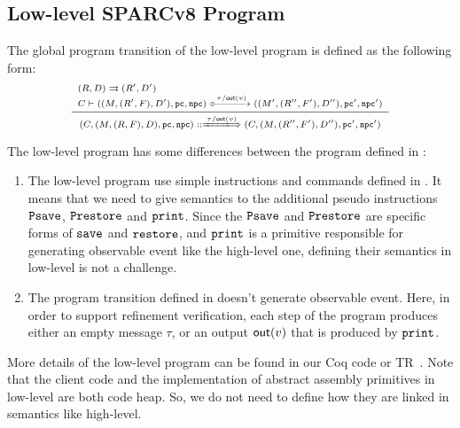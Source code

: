 \subsection{Low-level SPARCv8 Program}
\label{subsec:low-level SPARCv8 Program}


The global program transition of the low-level \sparc{} program is defined 
as the following form:
\[
    \scriptsize
    \infer
    {
        \LGlobTrans{(\code, (\Mem, (\RFile, \Wstack), \DBuf), \pc, \npc)}
            { \empmsg / \outEvt{\val} }
            {(\code, (\Mem, (\RFile'', \Wstack'), \DBuf''), \pc', \npc')}
    }
    {
        \begin{array}{l}
            \Dstep{(\RFile, \DBuf)}{(\RFile', \DBuf')} \\
            \llocalstep{\code}
                {((\Mem, (\RFile', \Wstack), \DBuf'), \pc, \npc)}
                { \empmsg / \outEvt{\val} }
                {((\Mem', (\RFile'', \Wstack'), \DBuf''), \pc', \npc')}
        \end{array}
    }
\]
{\color{blue}
The low-level \sparc{} program has 
some differences between the \sparc{} program defined in 
\Sec{\ref{sec:modeling}}: 
\begin{enumerate}
    \item The low-level \sparc{} program use simple 
        instructions and commands defined in 
        \Fig{\ref{fig:syntax-of-concur-pseudo-sparc}}. 
        It means that we need to give semantics to the additional 
        pseudo instructions $\texttt{Psave}$, $\texttt{Prestore}$ and 
        $\texttt{print}$. Since the $\texttt{Psave}$ and $\texttt{Prestore}$ 
        are specific forms of $\texttt{save}{}$ and 
        $\texttt{restore}{}$, and $\texttt{print}$ is a primitive 
        responsible for generating observable event
        like the high-level one, defining their 
        semantics in low-level is not a challenge.
    \item The program transition defined in 
        \Sec{\ref{sec:modeling}} doesn't generate 
        observable event. Here, in order to support 
        refinement verification, each step of the 
        program produces either an empty message $\tau$, 
        or an output $\textsf{out}({v})$ that is produced 
        by $\texttt{print}$. 
\end{enumerate}
}
More details of the low-level program can be found in 
our Coq code or TR~\cite{coqimp}. 
{\color{blue} Note that the client 
code and the implementation of abstract assembly primitives 
in low-level are both \sparc{} code heap. So, we do not need 
to define how they are linked in semantics like high-level.} 

